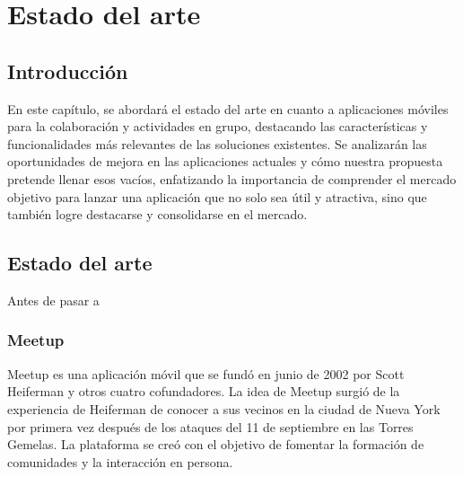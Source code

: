 \chapter{Estado del arte}
\section{Introducción}
En este capítulo, se abordará el estado del arte en
cuanto a aplicaciones móviles para la colaboración y
actividades en grupo, destacando las características y
funcionalidades más relevantes de las soluciones existentes.
Se analizarán las oportunidades de mejora en las aplicaciones actuales y cómo nuestra propuesta pretende llenar esos vacíos, 
enfatizando la importancia de comprender el mercado objetivo para lanzar una aplicación que no solo sea útil y atractiva, 
sino que también logre destacarse y consolidarse en el mercado.

\section{Estado del arte}

Antes de pasar a 
\subsection{Meetup}
Meetup es una aplicación móvil que se fundó en junio de 2002 por Scott Heiferman 
y otros cuatro cofundadores. La idea de Meetup surgió de la experiencia de Heiferman de 
conocer a sus vecinos en la ciudad de Nueva York por primera vez después de los 
ataques del 11 de septiembre en las Torres Gemelas. La plataforma se creó con el 
objetivo de fomentar la formación de comunidades y la interacción en persona. 

